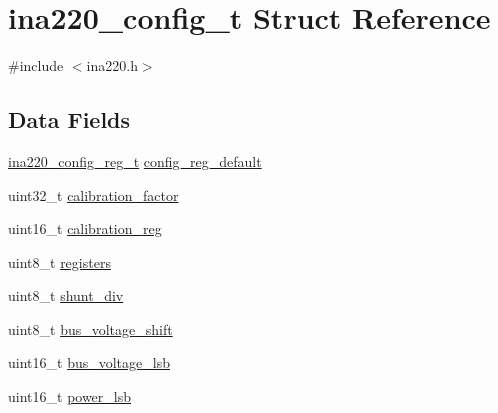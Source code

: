 \hypertarget{structina220__config__t}{\section{ina220\-\_\-config\-\_\-t Struct Reference}
\label{structina220__config__t}
}


{\ttfamily \#include $<$ina220.\-h$>$}

\subsection*{Data Fields}
\begin{DoxyCompactItemize}
\item 
\hyperlink{unionina220__config__reg__t}{ina220\-\_\-config\-\_\-reg\-\_\-t} \hyperlink{structina220__config__t_acbce4303801a7e0c5852beb3bfc54f70}{config\-\_\-reg\-\_\-default}
\item 
uint32\-\_\-t \hyperlink{structina220__config__t_ae0cf370fa216435cb7f376b742ec8677}{calibration\-\_\-factor}
\item 
uint16\-\_\-t \hyperlink{structina220__config__t_a53972f340d37483d9c354dc39e255cc3}{calibration\-\_\-reg}
\item 
uint8\-\_\-t \hyperlink{structina220__config__t_a4533b3b8b7676acceda9ffb54a82e946}{registers}
\item 
uint8\-\_\-t \hyperlink{structina220__config__t_ae5d9fa3cdaec6362d0dc70c88c45b0e0}{shunt\-\_\-div}
\item 
uint8\-\_\-t \hyperlink{structina220__config__t_a9b7ac597eedeb12c8585bab6e412af2c}{bus\-\_\-voltage\-\_\-shift}
\item 
uint16\-\_\-t \hyperlink{structina220__config__t_a7876214dfca8c176b5d35032282dea1e}{bus\-\_\-voltage\-\_\-lsb}
\item 
uint16\-\_\-t \hyperlink{structina220__config__t_a2e8bd312fafd0e208ffe39dff1ae7071}{power\-\_\-lsb}
\end{DoxyCompactItemize}


